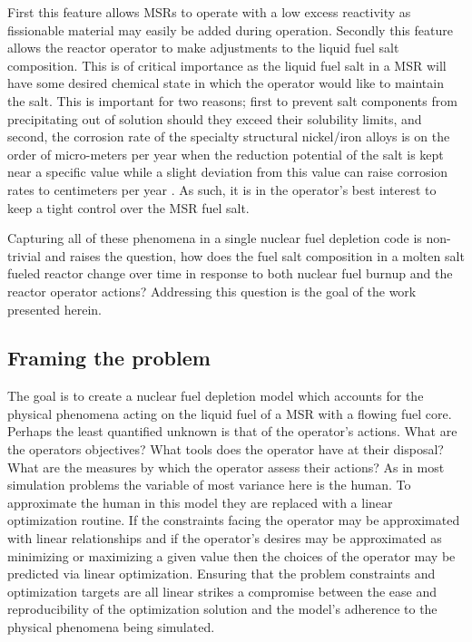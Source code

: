 First this feature allows MSRs to operate with a
low excess reactivity as fissionable material may easily be added during
operation. Secondly this feature allows the reactor operator to make adjustments
to the liquid fuel salt composition. This is of critical importance as the 
liquid fuel salt in a MSR will have some desired chemical state
in which the operator would like to maintain the salt. This is important for two
reasons; first to prevent salt components from precipitating out of solution
should they exceed their solubility limits, and second, the corrosion rate of 
the specialty structural nickel/iron alloys is on the order of
micro-meters per year when the reduction potential of the salt is kept near
a specific value while a slight deviation from this value can raise corrosion
rates to centimeters per year \cite{Corrosion}. 
As such, it is in the operator's best interest to keep a tight control over 
the MSR fuel salt.

Capturing all of these phenomena in a single nuclear fuel depletion code is
non-trivial and raises the question, how does the fuel salt composition in a 
molten salt fueled reactor change over time in response to both nuclear fuel
burnup and the reactor operator actions? Addressing this question is the goal
of the work presented herein. 

\subsection{Framing the problem}

The goal is to create a nuclear fuel depletion model which accounts for the
physical phenomena acting on the liquid fuel of a MSR with a flowing fuel core.
Perhaps the least quantified unknown is that of the operator's actions. What are
the operators objectives? What tools does the operator have at their disposal?
What are the measures by which the operator assess their actions? As in most
simulation problems the variable of most variance here is the human. To
approximate the human in this model they are replaced with a linear optimization
routine. If the constraints facing the operator may be approximated with linear
 relationships and if the operator's desires may be approximated as minimizing
or maximizing a given value then the choices of the operator may be predicted
via linear optimization. Ensuring that the problem constraints and optimization 
targets are all linear strikes a compromise between the ease and reproducibility
of the optimization solution and the model's adherence to the physical 
phenomena being simulated.

